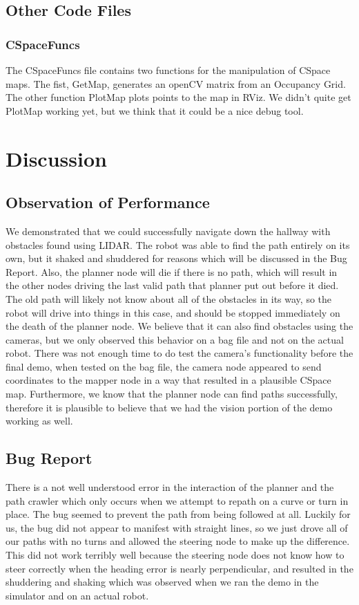 \documentclass{article}
\begin{document}
\subsection{Other Code Files}
\subsubsection{CSpaceFuncs}
The CSpaceFuncs file contains two functions for the manipulation of CSpace maps.  The fist, GetMap, generates an openCV matrix from an Occupancy Grid.  The other function PlotMap plots points to the map in RViz.  We didn't quite get PlotMap working yet, but we think that it could be a nice debug tool.


\section{Discussion}
\subsection{Observation of Performance}

We demonstrated that we could successfully navigate down the hallway with obstacles found using LIDAR.  
The robot was able to find the path entirely on its own, but it shaked and shuddered for reasons which will be discussed in the Bug Report.
Also, the planner node will die if there is no path, which will result in the other nodes driving the last valid path that planner put out before it died.  
The old path will likely not know about all of the obstacles in its way, so the robot will drive into things in this case, and should be stopped immediately on the death of the planner node.
We believe that it can also find obstacles using the cameras, but we only observed this behavior on a bag file and not on the actual robot.
There was not enough time to do test the camera's functionality before the final demo, when tested on the bag file, the camera node appeared to send coordinates to the mapper node in a way that resulted in a plausible CSpace map.
Furthermore, we know that the planner node can find paths successfully, therefore it is plausible to believe that we had the vision portion of the demo working as well.


\subsection{Bug Report}

There is a not well understood error in the interaction of the planner and the path crawler which only occurs when we attempt to repath on a curve or turn in place. 
The bug seemed to prevent the path from being followed at all.
Luckily for us, the bug did not appear to manifest with straight lines, so we just drove all of our paths with no turns and allowed the steering node to make up the difference.
This did not work terribly well because the steering node does not know how to steer correctly when the heading error is nearly perpendicular, and resulted in the shuddering and shaking which was observed when we ran the demo in the simulator and on an actual robot.
\end{document}

